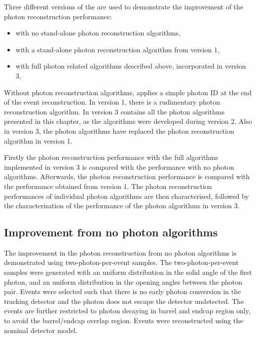 Three different versions of the \pandora are used to demonstrate the improvement of  the photon reconstruction performance:
\begin{itemize}
  \item with no stand-alone photon reconstruction algorithms,
  \item with a stand-alone photon reconstruction algorithm from \pandora version 1,
  \item with full photon related algorithms described above, incorporated in \pandora version 3,
\end{itemize}

Without photon reconstruction algorithms, \pandora applies a simple photon ID at the end of the event reconstruction. In \pandora version 1, there is a rudimentary photon reconstruction algorithm. In \pandora version 3 contains all the photon algorithms presented in this chapter, as the algorithms  were developed during \pandora version 2. Also in \pandora version 3, the photon algorithms  have replaced the   photon reconstruction algorithm in \pandora version 1.

Firstly the photon reconstruction performance with the full algorithms implemented in \pandora version 3 is compared with the performance with no photon algorithms. Afterwards, the photon reconstruction performance  is compared with the performance obtained from  \pandora version 1. The photon reconstruction performances of individual photon algorithms are then characterised, followed by the characterisation of the performance of the photon algorithms in \pandora version 3.

\subsection{Improvement from no photon algorithms}

The improvement in the photon reconstruction from no photon algorithms is demonstrated using  two-photon-per-event samples. The two-photon-per-event samples were generated with an uniform distribution in the solid angle of the first photon, and an uniform distribution in the opening angles  between the photon pair. Events were selected such that there is no early photon conversion in the tracking detector and the photon does not escape the detector undetected. The events are further restricted to photon decaying in barrel and endcap region only, to avoid the barrel/endcap overlap region. Events were reconstructed using the nominal \ILD detector model.

